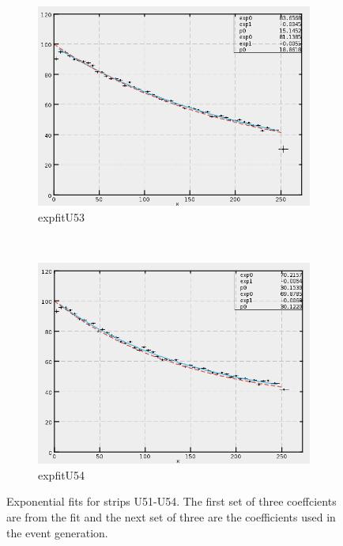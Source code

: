 \begin{figure}[h]
    \begin{subfigure}[h]{0.44\textwidth}
        \centering
        \includegraphics[width=\textwidth, keepaspectratio = true]{expfit_U53}
        \caption{expfitU53}
        \label{fig:expfit_U53}
    \end{subfigure}
    ~
    \begin{subfigure}[h]{0.44\textwidth}
        \centering
        \includegraphics[width=\textwidth, keepaspectratio = true]{expfit_U54}
        \caption{expfitU54}
        \label{fig:expfit_U54}
    \end{subfigure}
    \caption{Exponential fits for strips U51-U54. The first set of three coeffcients are from the fit and the next set of three are
     the coefficients used in the event generation.}
    \label{fig:expfit1}
\end{figure}

